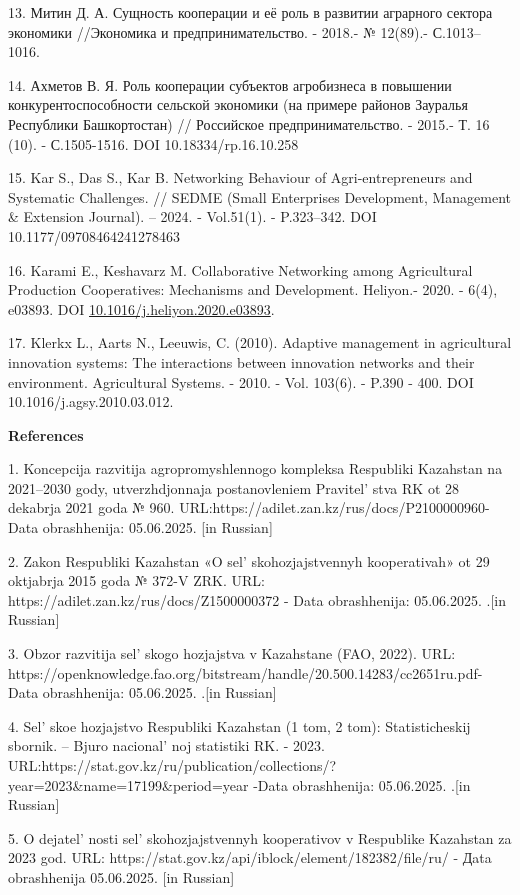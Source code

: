 13. Митин Д. А. Сущность кооперации и её роль в развитии аграрного
сектора экономики //Экономика и предпринимательство. - 2018.- № 12(89).-
С.1013--1016.

14. Ахметов В. Я. Роль кооперации субъектов агробизнеса в повышении
конкурентоспособности сельской экономики (на примере районов Зауралья
Республики Башкортостан) // Российское предпринимательство. - 2015.- Т.
16 (10). - С.1505-1516. DOI 10.18334/rp.16.10.258

15. Kar S., Das S., Kar B. Networking Behaviour of Agri-entrepreneurs
and Systematic Challenges. // SEDME (Small Enterprises Development,
Management \& Extension Journal). -- 2024. - Vol.51(1). - P.323--342.
DOI 10.1177/09708464241278463

16. Karami E., Keshavarz M. Collaborative Networking among Agricultural
Production Cooperatives: Mechanisms and Development. Heliyon.- 2020. -
6(4), e03893. DOI
\href{https://doi.org/10.1016/j.heliyon.2020.e03893}{10.1016/j.heliyon.2020.e03893}.

17. Klerkx L., Aarts N., Leeuwis, C. (2010). Adaptive management in
agricultural innovation systems: The interactions between innovation
networks and their environment. Agricultural Systems. - 2010. - Vol.
103(6). - P.390 - 400. DOI 10.1016/j.agsy.2010.03.012.

{\bfseries References}

1. Koncepcija razvitija agropromyshlennogo kompleksa Respubliki Kazahstan
na 2021--2030 gody, utverzhdjonnaja postanovleniem
Pravitel' stva RK ot 28 dekabrja 2021 goda № 960.
URL:https://adilet.zan.kz/rus/docs/P2100000960- Data obrashhenija:
05.06.2025. {[}in Russian{]}

2. Zakon Respubliki Kazahstan «O sel' skohozjajstvennyh
kooperativah» ot 29 oktjabrja 2015 goda № 372-V ZRK. URL:
https://adilet.zan.kz/rus/docs/Z1500000372 - Data obrashhenija:
05.06.2025. .{[}in Russian{]}

3. Obzor razvitija sel' skogo hozjajstva v Kazahstane
(FAO, 2022). URL:
https://openknowledge.fao.org/bitstream/handle/20.500.14283/cc2651ru.pdf-
Data obrashhenija: 05.06.2025. .{[}in Russian{]}

4. Sel' skoe hozjajstvo Respubliki Kazahstan (1 tom, 2
tom): Statisticheskij sbornik. -- Bjuro nacional' noj
statistiki RK. - 2023.
URL:https://stat.gov.kz/ru/publication/collections/?year=2023\&name=17199\&period=year
-Data obrashhenija: 05.06.2025. .{[}in Russian{]}

5. O dejatel' nosti sel' skohozjajstvennyh
kooperativov v Respublike Kazahstan za 2023 god. URL:
https://stat.gov.kz/api/iblock/element/182382/file/ru/ - Дata
obrashhenija 05.06.2025. {[}in Russian{]}

